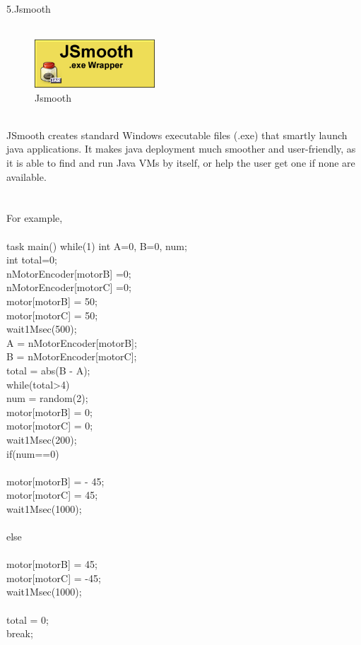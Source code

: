 \documentclass[a4paper,11pt]{IEEEtran}
\begin{document}
{~\\
~\\
5.Jsmooth
~\\
~\\
\begin{figure}[!h]
        \centering
        \includegraphics[width=0.4\textwidth]{jsmooth.jpg}
        \caption{Jsmooth}
        \label{fig1}
\end{figure}
~\\
JSmooth creates standard Windows executable files (.exe) that smartly launch java applications. It makes java deployment much smoother and user-friendly, as it is able to find and run Java VMs by itself, or help the user get one if none are available.\\
~\\
~\\
For example,\\
~\\
task main()
{  
  while(1)
  {
    int A=0, B=0, num;\\
    int total=0;\\
    nMotorEncoder[motorB] =0;\\
    nMotorEncoder[motorC] =0;\\
    motor[motorB] = 50;\\
    motor[motorC] = 50;\\
    wait1Msec(500);\\
  
    A = nMotorEncoder[motorB];\\
    B = nMotorEncoder[motorC];\\
    total = abs(B - A);\\
    while(total>4){\\
      num = random(2);\\
      motor[motorB] = 0;\\
      motor[motorC] = 0;\\
      wait1Msec(200);  \\
      if(num==0)\\
      {\\
        motor[motorB] = - 45;\\
        motor[motorC] = 45;\\
        wait1Msec(1000);\\
      }\\
      else\\
      {\\
        motor[motorB] = 45;\\
        motor[motorC] = -45;\\
        wait1Msec(1000);\\
      }\\
      total = 0;\\
      break;}\\
  }\\
}\\
}
\end{document}
